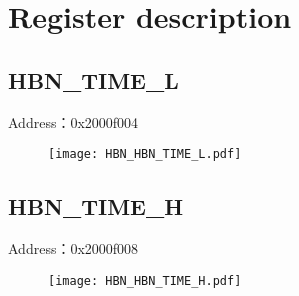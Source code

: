 \section{Register description}

\subsection{HBN\_TIME\_L}
\label{HBN-HBN-TIME-L}
Address：0x2000f004
 \begin{figure}[H]
\texttt{[image: HBN\_HBN\_TIME\_L.pdf]}
\end{figure}

\subsection{HBN\_TIME\_H}
\label{HBN-HBN-TIME-H}
Address：0x2000f008
 \begin{figure}[H]
\texttt{[image: HBN\_HBN\_TIME\_H.pdf]}
\end{figure}

